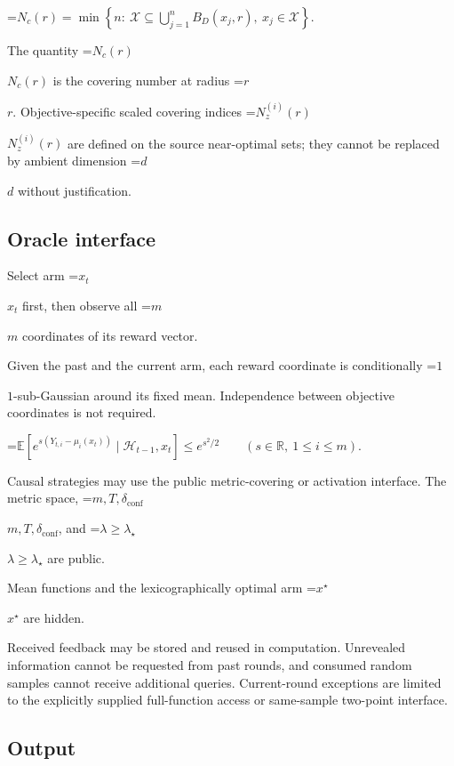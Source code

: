 \documentclass[10pt,a4paper]{article}
\newcommand{\AtlasMath}[1]{\par\begingroup\centering\setbox0=\hbox{$\displaystyle #1$}\ifdim\wd0>1.4\linewidth\typeout{ATLAS WIDE FORMULA: \the\wd0}\fi\ifdim\wd0>\linewidth\resizebox{\linewidth}{!}{\box0}\else\box0\fi\par\endgroup}
\newcommand{\AtlasInlineMath}[1]{\begingroup\setbox0=\hbox{$#1$}\ifdim\wd0>.4\linewidth\endgroup\AtlasMath{#1}\else\endgroup$#1$\fi}
\begin{document}
\AtlasMath{N_c(r)=\min\!\left\{n:\ \mathcal{X}\subseteq\bigcup_{j=1}^{n}B_D(x_j,r),\ x_j\in\mathcal{X}\right\}.}




The quantity \AtlasInlineMath{N_c(r)} is the covering number at radius \AtlasInlineMath{r}. Objective-specific scaled covering indices \AtlasInlineMath{N_z^{(i)}(r)} are defined on the source near-optimal sets; they cannot be replaced by ambient dimension \AtlasInlineMath{d} without justification.



\subsection{Oracle interface}


Select arm \AtlasInlineMath{x_t} first, then observe all \AtlasInlineMath{m} coordinates of its reward vector.



Given the past and the current arm, each reward coordinate is conditionally \AtlasInlineMath{1}-sub-Gaussian around its fixed mean. Independence between objective coordinates is not required.




\AtlasMath{\mathbb{E}\!\left[e^{s(Y_{t,i}-\mu_i(x_t))}\mid\mathcal{H}_{t-1},x_t\right]\le e^{s^2/2}\qquad(s\in\mathbb{R},\ 1\le i\le m).}




Causal strategies may use the public metric-covering or activation interface. The metric space, \AtlasInlineMath{m,T,\delta_{\mathrm{conf}}}, and \AtlasInlineMath{\lambda\ge\lambda_\star} are public.



Mean functions and the lexicographically optimal arm \AtlasInlineMath{x^\star} are hidden.



Received feedback may be stored and reused in computation. Unrevealed information cannot be requested from past rounds, and consumed random samples cannot receive additional queries. Current-round exceptions are limited to the explicitly supplied full-function access or same-sample two-point interface.



\subsection{Output}
\end{document}
